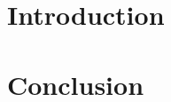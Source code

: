 \documentclass[a4paper]{article}
\begin{document}
\let\cleardoublepage\clearpage















\section{Introduction}




















\section{Conclusion}

























\newpage \tableofcontents \listoffigures
\begin{thebibliography}{9}
\end{thebibliography}
\end{document}
